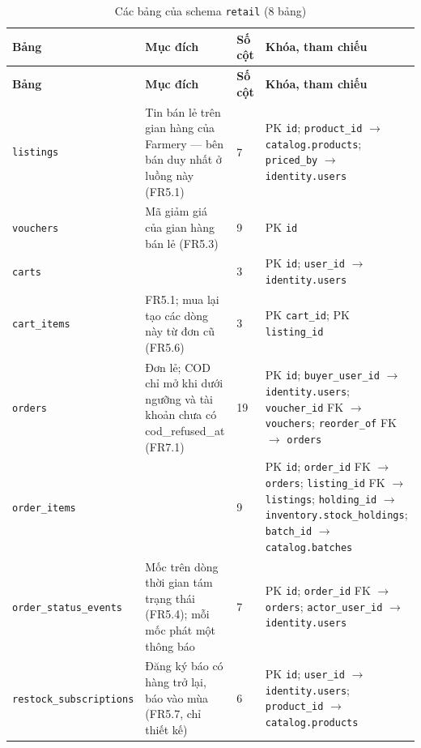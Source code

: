 \begingroup
\tblsetup\footnotesize\renewcommand{\arraystretch}{1.1}
\begin{longtable}{L{3.20cm} L{5.60cm} L{1.10cm} L{5.00cm}}
\caption{Các bảng của schema \texttt{retail} (8 bảng)}
\label{tab:db-retail} \\
\toprule
{}
\textbf{Bảng} & \textbf{Mục đích} & \textbf{Số cột} & \textbf{Khóa, tham chiếu} \\
\midrule
\endfirsthead
\toprule
{}
\textbf{Bảng} & \textbf{Mục đích} & \textbf{Số cột} & \textbf{Khóa, tham chiếu} \\
\midrule
\endhead
\bottomrule
\endfoot
\texttt{listings} & Tin bán lẻ trên gian hàng của Farmery — bên bán duy nhất ở luồng này (FR5.1) & 7 & PK \texttt{id}; \texttt{product\_\allowbreak{}id} $\to$ \texttt{catalog.products}; \texttt{priced\_\allowbreak{}by} $\to$ \texttt{identity.users} \\
\texttt{vouchers} & Mã giảm giá của gian hàng bán lẻ (FR5.3) & 9 & PK \texttt{id} \\
\texttt{carts} &  & 3 & PK \texttt{id}; \texttt{user\_\allowbreak{}id} $\to$ \texttt{identity.users} \\
\texttt{cart\_\allowbreak{}items} & FR5.1; mua lại tạo các dòng này từ đơn cũ (FR5.6) & 3 & PK \texttt{cart\_\allowbreak{}id}; PK \texttt{listing\_\allowbreak{}id} \\
\texttt{orders} & Đơn lẻ; COD chỉ mở khi dưới ngưỡng và tài khoản chưa có cod\_refused\_at (FR7.1) & 19 & PK \texttt{id}; \texttt{buyer\_\allowbreak{}user\_\allowbreak{}id} $\to$ \texttt{identity.users}; \texttt{voucher\_\allowbreak{}id} FK $\to$ \texttt{vouchers}; \texttt{reorder\_\allowbreak{}of} FK $\to$ \texttt{orders} \\
\texttt{order\_\allowbreak{}items} &  & 9 & PK \texttt{id}; \texttt{order\_\allowbreak{}id} FK $\to$ \texttt{orders}; \texttt{listing\_\allowbreak{}id} FK $\to$ \texttt{listings}; \texttt{holding\_\allowbreak{}id} $\to$ \texttt{inventory.stock\_\allowbreak{}holdings}; \texttt{batch\_\allowbreak{}id} $\to$ \texttt{catalog.batches} \\
\texttt{order\_\allowbreak{}status\_\allowbreak{}events} & Mốc trên dòng thời gian tám trạng thái (FR5.4); mỗi mốc phát một thông báo & 7 & PK \texttt{id}; \texttt{order\_\allowbreak{}id} FK $\to$ \texttt{orders}; \texttt{actor\_\allowbreak{}user\_\allowbreak{}id} $\to$ \texttt{identity.users} \\
\texttt{restock\_\allowbreak{}subscriptions} & Đăng ký báo có hàng trở lại, báo vào mùa (FR5.7, chỉ thiết kế) & 6 & PK \texttt{id}; \texttt{user\_\allowbreak{}id} $\to$ \texttt{identity.users}; \texttt{product\_\allowbreak{}id} $\to$ \texttt{catalog.products} \\
\end{longtable}
\endgroup


